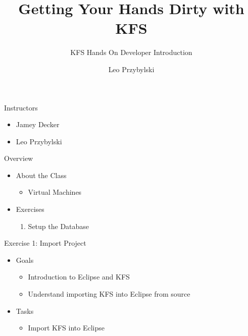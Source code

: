 \documentclass[xcolor=dvipsnames,14pt]{beamer}
\begin{document}
\title[A short proof]{Getting Your Hands Dirty with KFS}
\subtitle[Errors]{KFS Hands On Developer Introduction}
\author[Leo]{Leo Przybylski}



\begin{frame}[plain]
  \titlepage
\end{frame}

\begin{frame}{Instructors}
	\begin{itemize}
		\item Jamey Decker
		\item Leo Przybylski
	\end{itemize}
\end{frame}

\begin{frame}{Overview}
	\begin{itemize}
		\item About the Class
		\begin{itemize}
			\item Virtual Machines
		\end{itemize}
        \item Exercises
        \begin{enumerate}
            \item Setup the Database                  
        \end{enumerate}
	\end{itemize}
\end{frame}

\begin{frame}[fragile]{Exercise 1: Import Project}
	\begin{itemize}
		\item Goals
          \begin{itemize}
            \item Introduction to Eclipse and KFS
            \item Understand importing KFS into Eclipse from source
          \end{itemize}          
		\item Tasks
          \begin{itemize}
            \item Import KFS into Eclipse
          \end{itemize}          
	\end{itemize}

\end{frame}
\end{document}
